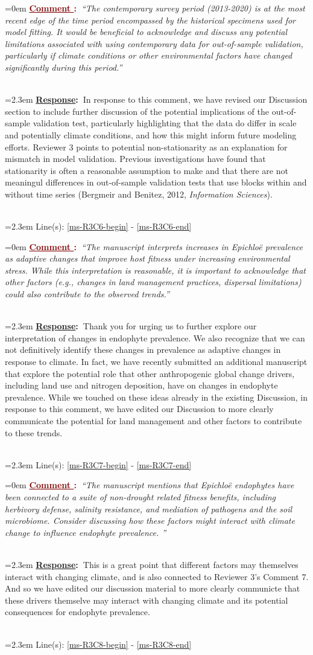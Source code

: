 \documentclass[12pt]{article}
\newcounter{cN}
\newcommand{\comment}[1]{
	\vspace{2em}
	\refstepcounter{cN} %
	\noindent \hangindent=0em \textbf{\textcolor{Maroon}{\uline{Comment \thecN}:~}}\emph{``#1''}
	}
\newcommand{\response}[1]{
	\\[0.25em]
	\hangindent=2.3em \textbf{\textcolor{NavyBlue}{\uline{Response}:~}}#1
	}
\newcommand{\linesref}[2]{
		\\[0.25em]
	\hangindent=2.3em {\color{Mahogany} Line(s): \ref{#1} - \ref{#2}}
}
\begin{document}
\comment{The contemporary survey period (2013-2020) is at the most recent edge of the time period encompassed by the historical specimens used for model fitting. It would be beneficial to acknowledge and discuss any potential limitations associated with using contemporary data for out-of-sample validation, particularly if climate conditions or other environmental factors have changed significantly during this period.}
\response{In response to this comment, we have revised our Discussion section to include further discussion of the potential implications of the out-of-sample validation test, particularly highlighting that the data do differ in scale and potentially climate conditions, and how this might inform future modeling efforts. Reviewer 3 points to potential non-stationarity as an explanation for mismatch in model validation. Previous investigations have found that stationarity is often a reasonable assumption to make and that there are not meaningul differences in out-of-sample validation tests that use blocks within and without time series (Bergmeir and Benitez, 2012, \emph{Information Sciences}).}
\linesref{ms-R3C6-begin}{ms-R3C6-end}


\comment{The manuscript interprets increases in Epichloë prevalence as adaptive changes that improve host fitness under increasing environmental stress. While this interpretation is reasonable, it is important to acknowledge that other factors (e.g., changes in land management practices, dispersal limitations) could also contribute to the observed trends.}
\response{Thank you for urging us to further explore our interpretation of changes in endophyte prevalence. We also recognize that we can not definitively identify these changes in prevalence as adaptive changes in response to climate. In fact, we have recently submitted an additional manuscript that explore the potential role that other anthropogenic global change drivers, including land use and nitrogen deposition, have on changes in endophyte prevalence. While we touched on these ideas already in the existing Discussion, in response to this comment, we have edited our Discussion to more clearly communicate the potential for land management and other factors to contribute to these trends.}
\linesref{ms-R3C7-begin}{ms-R3C7-end}



\comment{The manuscript mentions that Epichloë endophytes have been connected to a suite of non-drought related fitness benefits, including herbivory defense, salinity resistance, and mediation of pathogens and the soil microbiome. Consider discussing how these factors might interact with climate change to influence endophyte prevalence.
}
\response{This is a great point that different factors may themselves interact with changing climate, and is also connected to Reviewer 3's Comment 7. And so we have edited our discussion material to more clearly communicte that these drivers themselve may interact with changing climate and its potential consequences for endophyte prevalence.}
\linesref{ms-R3C8-begin}{ms-R3C8-end}
\end{document}
